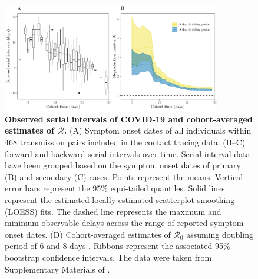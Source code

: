 \documentclass[12pt]{article}
\newcommand{\Rx}[1]{\ensuremath{{\mathcal R}_{#1}}\xspace}
\newcommand{\Ro}{\Rx{0}}
\newcommand{\RR}{\ensuremath{{\mathcal R}}\xspace}
\begin{document}
\begin{figure}[!th]
\begin{center}
\includegraphics[width=0.85\textwidth]{serial_analysis.pdf}
\caption{
\textbf{Observed serial intervals of COVID-19 and cohort-averaged estimates of \RR.}
(A) Symptom onset dates of all individuals within 468 transmission pairs included in the contact tracing data.
(B--C) forward and backward serial intervals over time.
Serial interval data have been grouped based on the symptom onset dates of primary (B) and secondary (C) cases.
Points represent the means. 
Vertical error bars represent the 95\% equi-tailed quantiles.
Solid lines represent the estimated locally estimated scatterplot smoothing (LOESS) fits.
The dashed line represents the maximum and minimum observable delays across the range of reported symptom onset dates.
(D) Cohort-averaged estimates of \Ro assuming doubling period of 6 and 8 days \citep{li2020early, wu2020nowcasting}.
Ribbons represent the associated 95\% bootstrap confidence intervals.
The data were taken from Supplementary Materials of \cite{du2020serial}.
}
\label{fig:du}
\end{center}
\end{figure}
\end{document}
